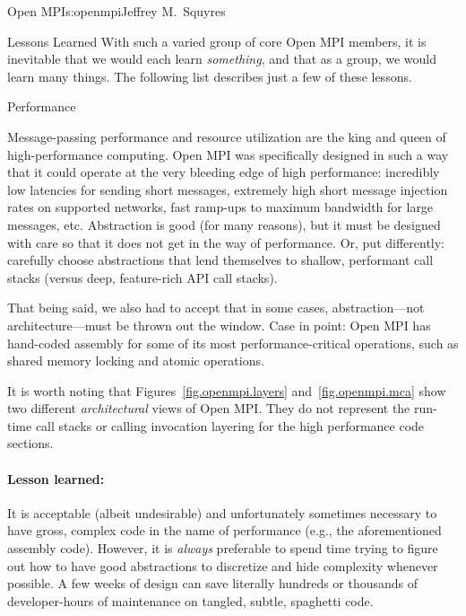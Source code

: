 \begin{aosachapter}{Open MPI}{s:openmpi}{Jeffrey M.\ Squyres}
\begin{aosasect1}{Lessons Learned}
With such a varied group of core Open MPI members, it is inevitable that
we would each learn \emph{something}, and that as a group, we would
learn many things.  The following list describes just a few of these
lessons.


\begin{aosasect2}{Performance}

Message-passing performance and resource utilization are the king
and queen of high-performance computing.
%
Open MPI was specifically designed in such a way that it could operate
at the very bleeding edge of high performance: incredibly low
latencies for sending short messages, extremely high short message
injection rates on supported networks, fast ramp-ups to maximum
bandwidth for large messages, etc.
%
Abstraction is good (for many reasons), but it must be designed with
care so that it does not get in the way of performance.  Or, put
differently: carefully choose abstractions that lend themselves to
shallow, performant call stacks (versus deep, feature-rich API call
stacks).

That being said, we also had to accept that in some cases, abstraction---not 
architecture---must be thrown out the window.  Case in point:
Open MPI has hand-coded assembly for some of its most
performance-critical operations, such as shared memory locking and
atomic operations.

It is worth noting that Figures~\ref{fig.openmpi.layers}
and~\ref{fig.openmpi.mca} show two different \emph{architectural} views
of Open MPI.
%
They do not represent the run-time call stacks or calling invocation
layering for the high performance code sections.


\paragraph{Lesson learned:} 

It is acceptable (albeit undesirable) and unfortunately sometimes
necessary to have gross, complex code in the name of performance
(e.g., the aforementioned assembly code).
%
However, it is \emph{always} preferable to spend time trying to figure
out how to have good abstractions to discretize and hide complexity
whenever possible.  A few weeks of design can save literally hundreds
or thousands of developer-hours of maintenance on tangled, subtle, spaghetti
code.


\end{aosasect2}
\end{aosasect1}
\end{aosachapter}
